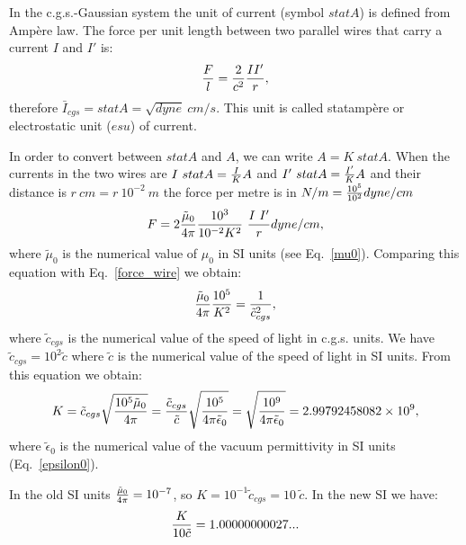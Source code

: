 \documentclass[12pt,a4paper]{article}
\def\kappa{2.99792458082\times 10^{9}}
\def\kappadiecic{1.00000000027}
\begin{document}
{\color{orange} In the c.g.s.-Gaussian system the unit of current 
(symbol $statA$) is defined from Amp\`ere law. The force per unit length 
between two parallel wires that carry a current $I$ and $I'$ is:
\begin{equation}
{F\over l} = {2\over c^2} {I I'\over r},
\label{force_wire}
\end{equation}
therefore $\bar I_{cgs}=statA=\sqrt{dyne}\ cm/s$. This unit is called 
statamp\`ere or 
electrostatic unit ($esu$) of current.

In order to convert between $statA$ and $A$, we can write $A= K\ statA$. 
When the currents in the two wires are $I\ statA={I\over K} A$ and 
$I'\ statA={I'\over K} A$ and their distance
is $r\ cm=r\ 10^{-2}\ m$ the force per metre is in $N/m=
{10^5\over 10^2} dyne/cm$
\begin{equation}
F=2{\tilde \mu_0\over 4\pi} {10^3\over 10^{-2} K^2}\ {I\ I' \over r} dyne/cm,
\end{equation}
where $\tilde \mu_0$ is the numerical value of $\mu_0$ in SI units
(see Eq.~\ref{mu0}). Comparing this equation with Eq.~\ref{force_wire} we
obtain:
\begin{equation}
{\tilde \mu_0 \over 4 \pi} {10^5\over K^2} = 
{1\over \tilde c_{cgs}^2}, 
\end{equation}
where $\tilde c_{cgs}$ is the numerical value of the speed of light in
c.g.s. units. We have $\tilde c_{cgs}=10^2 \tilde c$ where $\tilde c$ is
the numerical value of the speed of light in SI units. From this
equation we obtain:
\begin{equation}
K = \tilde c_{cgs} \sqrt {10^5 \tilde \mu_0 \over 4 \pi} =
{\tilde c_{cgs}\over \tilde c} 
\sqrt {10^5 \over 4 \pi \tilde \epsilon_0}=\sqrt {10^9 \over 4 \pi 
\tilde \epsilon_0}=\kappa,
\label{force_wire}
\end{equation}
where $\tilde \epsilon_0$ is the numerical value of the vacuum permittivity
in SI units (Eq.~\ref{epsilon0}).

In the old SI units ${\tilde \mu_0 \over 4 \pi} = 10^{-7}$, so 
$K=10^{-1} \tilde c_{cgs}= 10\ \tilde c$.
In the new SI we have:
\begin{equation}
{K\over 10 \tilde c}= \kappadiecic...
\end{equation}
\\
}
\end{document}
